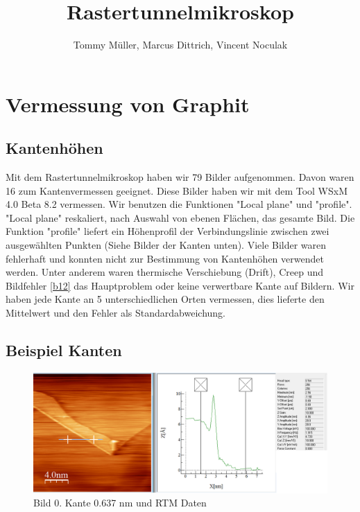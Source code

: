 \documentclass[10pt,a4paper]{article}
\author{Tommy Müller, Marcus Dittrich, Vincent Noculak}
\title{Rastertunnelmikroskop}
\begin{document}
\maketitle
\newpage
\tableofcontents
\newpage

\section{Vermessung von Graphit }

\subsection{ Kantenhöhen}

Mit dem Rastertunnelmikroskop haben wir 79 Bilder aufgenommen. Davon waren 16 zum Kantenvermessen geeignet.
Diese Bilder haben wir mit dem Tool WSxM 4.0 Beta 8.2 vermessen. 
Wir benutzen die Funktionen "Local plane" und "profile". "Local plane" reskaliert, nach Auswahl von ebenen Flächen, das gesamte Bild.  Die Funktion "profile" liefert ein Höhenprofil der Verbindungslinie zwischen zwei ausgewählten Punkten (Siehe Bilder der Kanten unten).
Viele Bilder waren fehlerhaft und konnten nicht zur Bestimmung von Kantenhöhen verwendet werden. Unter anderem waren thermische Verschiebung (Drift), Creep und Bildfehler  \ref{b12} das Hauptproblem oder keine verwertbare Kante auf Bildern. Wir haben jede Kante an 5 unterschiedlichen Orten vermessen, dies lieferte den Mittelwert und den Fehler als Standardabweichung.



\subsection{Beispiel Kanten}

\begin{figure}[]
	\includegraphics[scale = 0.3]{bild00.png}
	\centering
	\caption{Bild 0. Kante 0.637 nm und RTM Daten}
	\label{b0}
\end{figure}
\end{document}
